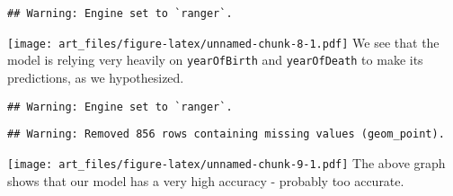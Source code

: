 \documentclass[]{article}
\newenvironment{Shaded}{\begin{snugshade}}{\end{snugshade}}
\newcommand{\DataTypeTok}[1]{\textcolor[rgb]{0.13,0.29,0.53}{#1}}
\newcommand{\DecValTok}[1]{\textcolor[rgb]{0.00,0.00,0.81}{#1}}
\newcommand{\KeywordTok}[1]{\textcolor[rgb]{0.13,0.29,0.53}{\textbf{#1}}}
\newcommand{\NormalTok}[1]{#1}
\newcommand{\OperatorTok}[1]{\textcolor[rgb]{0.81,0.36,0.00}{\textbf{#1}}}
\newcommand{\StringTok}[1]{\textcolor[rgb]{0.31,0.60,0.02}{#1}}
\begin{document}
\begin{verbatim}
## Warning: Engine set to `ranger`.
\end{verbatim}

\texttt{[image: art\_files/figure-latex/unnamed-chunk-8-1.pdf]} We see
that the model is relying very heavily on \texttt{yearOfBirth} and
\texttt{yearOfDeath} to make its predictions, as we hypothesized.

\begin{Shaded}
\end{Shaded}

\begin{verbatim}
## Warning: Engine set to `ranger`.
\end{verbatim}

\begin{verbatim}
## Warning: Removed 856 rows containing missing values (geom_point).
\end{verbatim}

\texttt{[image: art\_files/figure-latex/unnamed-chunk-9-1.pdf]} The above
graph shows that our model has a very high accuracy - probably too
accurate.
\end{document}

